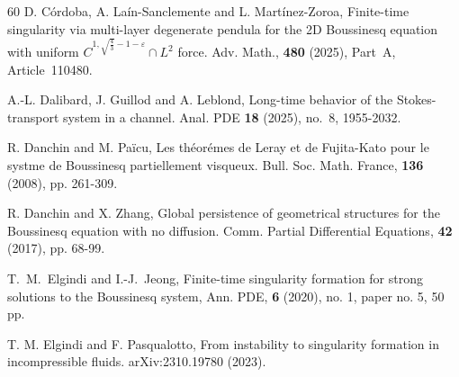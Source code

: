 \documentclass[reqno,11pt,a4paper]{amsart}
\begin{document}
\begin{thebibliography}{60}
D. C\'ordoba, A. La\'in-Sanclemente and L. Mart\'inez-Zoroa,
Finite-time singularity via multi-layer degenerate pendula
for the 2D Boussinesq equation with uniform
$C^{1,\sqrt{\frac{4}{3}}-1-\varepsilon}\cap L^2$ force.
Adv. Math.,
\textbf{480} (2025), Part~A, Article~110480.

A.-L. Dalibard, J. Guillod and A. Leblond,
Long-time behavior of the Stokes-transport system in a channel.
Anal. PDE {\bf 18} (2025), no.~8, 1955-2032.



R. Danchin and M. Pa\"icu, 
Les th\'eor\'emes de Leray et de Fujita-Kato pour le systme de Boussinesq partiellement visqueux. 
Bull. Soc. Math. France, \textbf{136} (2008), pp. 261-309.

 R. Danchin and X. Zhang,
Global persistence of geometrical structures for the Boussinesq equation with no diffusion. 
Comm. Partial Differential Equations, \textbf{42} (2017), pp. 68-99.

T.~M.~Elgindi and I.-J.~Jeong,
Finite-time singularity formation for strong solutions to the Boussinesq system,
Ann. PDE, \textbf{6} (2020), no. 1, paper no. 5, 50 pp.




T. M. Elgindi and F. Pasqualotto,
From instability to singularity formation
in incompressible fluids.
arXiv:2310.19780 (2023).





\end{thebibliography}
\end{document}
